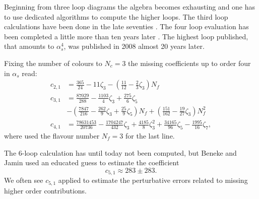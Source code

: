 \documentclass[../../index.tex]{subfiles}
\begin{document}
Beginning from three loop diagrams the algebra becomes exhausting and one has to
use dedicated algorithms to compute the higher loops. The third loop
calculations have been done in the late seventies
\cite{Chetyrkin1979,Dine1979,Celmaster1979}. The four loop evaluation has been
completed a little more than ten years later
\cite{Gorishnii1990,Surguladze1990}. The highest loop published, that amounts to
\(\alpha_s^4\), was published in 2008 \cite{Baikov2008} almost 20 years later.

Fixing the number of colours to \(N_c=3\) the missing coefficients up to order
four in \(\alpha_s\) read:
\begin{equation}
  \label{eq:adlerCoefficients}
  \begin{split}
    c_{2,1} &= \frac{365}{24} - 11 \zeta_3 - \left( \frac{11}{12} - \frac{2}{3}\zeta_3 \right) N_f \\
    c_{3,1} &= \frac{87029}{288} - \frac{1103}{4} \zeta_3 + \frac{275}{6}\zeta_5 \\
    &- \left( \frac{7847}{216} - \frac{262}{9} \zeta_3 + \frac{25}{9} \zeta_5 \right) N_f + \left( \frac{151}{162} - \frac{19}{27}\zeta_3\right)N_f^2 \\
    c_{4,1} &= \frac{78631453}{20736} - \frac{1704247}{432}\zeta_3 +
    \frac{4185}{8}\zeta_3^2 + \frac{34165}{96}\zeta_5 - \frac{1995}{16}\zeta_7,
  \end{split}
\end{equation}
where used the flavour number \(N_f=3\) for the last line.

The 6-loop calculation has until today not been computed, but Beneke and Jamin
\cite{Beneke2008} used an educated guess to estimate the coefficient
\begin{equation}
  c_{5,1} \approx 283 \pm 283.
\end{equation}
We often see \(c_{5,1}\) applied to estimate the perturbative errors related to
missing higher order contributions.
\end{document}
